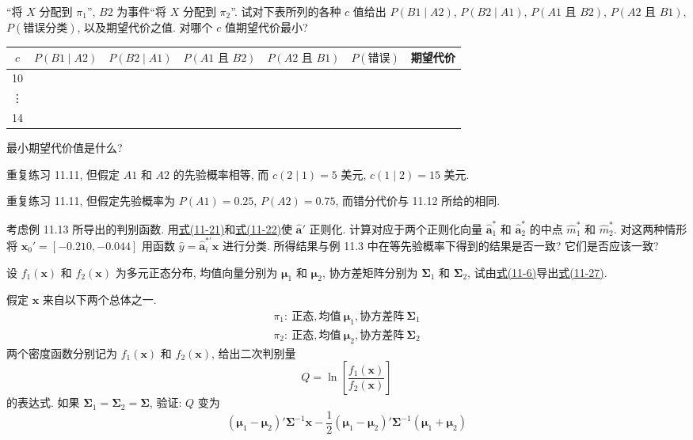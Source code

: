 
“将 $X$ 分配到 $\pi_1$”, $B2$ 为事件“将 $X$ 分配到 $\pi_2$”. 试对下表所列的各种 $c$ 值给出 $P(B1\mid A2)$, $P(B2\mid A1)$, $P(A1\text{ 且 }B2)$, $P(A2\text{ 且 }B1)$, $P(\text{错误分类})$, 以及期望代价之值. 对哪个 $c$ 值期望代价最小?

\begin{mvtable}
\begin{tabular}{ccccccc}
\toprule
$c$ & $P(B1\mid A2)$ & $P(B2\mid A1)$ & $P(A1\text{ 且 }B2)$ & $P(A2\text{ 且 }B1)$ & $P(\text{错误})$ & 期望代价\\
\midrule
10 & & & & & & \\
\vdots & & & & & & \\
14 & & & & & & \\
\bottomrule
\end{tabular}
\end{mvtable}

最小期望代价值是什么?

\quad 重复练习 11.11, 但假定 $A1$ 和 $A2$ 的先验概率相等, 而 $c(2\mid 1)=5$ 美元, $c(1\mid 2)=15$ 美元.

\quad 重复练习 11.11, 但假定先验概率为 $P(A1)=0.25$, $P(A2)=0.75$, 而错分代价与 11.12 所给的相同.

\quad 考虑例 11.13 所导出的判别函数. 用\hyperref[eq:11-21]{式(11-21)}和\hyperref[eq:11-22]{式(11-22)}使 $\hat{\mathbf{a}}'$ 正则化. 计算对应于两个正则化向量 $\hat{\mathbf{a}}_1^*$ 和 $\hat{\mathbf{a}}_2^*$ 的中点 $\hat{m}_1^*$ 和 $\hat{m}_2^*$. 对这两种情形将 $\mathbf{x}_0'=[-0.210,-0.044]$ 用函数 $\hat{y}=\hat{\mathbf{a}}_i^{*\prime}\mathbf{x}$ 进行分类. 所得结果与例 11.3 中在等先验概率下得到的结果是否一致? 它们是否应该一致?

\quad 设 $f_1(\mathbf{x})$ 和 $f_2(\mathbf{x})$ 为多元正态分布, 均值向量分别为 $\boldsymbol{\mu}_1$ 和 $\boldsymbol{\mu}_2$, 协方差矩阵分别为 $\boldsymbol{\Sigma}_1$ 和 $\boldsymbol{\Sigma}_2$, 试由\hyperref[eq:11-6]{式(11-6)}导出\hyperref[eq:11-27]{式(11-27)}.

\quad 假定 $\mathbf{x}$ 来自以下两个总体之一.
\[
\begin{gathered}
\pi_1:\ \text{正态}, \text{均值}\ \boldsymbol{\mu}_1, \text{协方差阵}\ \boldsymbol{\Sigma}_1\\
\pi_2:\ \text{正态}, \text{均值}\ \boldsymbol{\mu}_2, \text{协方差阵}\ \boldsymbol{\Sigma}_2
\end{gathered}
\]
两个密度函数分别记为 $f_1(\mathbf{x})$ 和 $f_2(\mathbf{x})$, 给出二次判别量
\[
Q=\ln\left[\frac{f_1(\mathbf{x})}{f_2(\mathbf{x})}\right]
\]
的表达式. 如果 $\boldsymbol{\Sigma}_1=\boldsymbol{\Sigma}_2=\boldsymbol{\Sigma}$, 验证: $Q$ 变为
\[
(\boldsymbol{\mu}_1-\boldsymbol{\mu}_2)'\boldsymbol{\Sigma}^{-1}\mathbf{x}-\frac{1}{2}(\boldsymbol{\mu}_1-\boldsymbol{\mu}_2)'\boldsymbol{\Sigma}^{-1}(\boldsymbol{\mu}_1+\boldsymbol{\mu}_2)
\]

